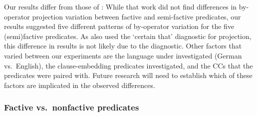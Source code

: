 \documentclass[a4paper,12pt,twoside]{article}
\newcommand{\posscite}[1]{\citeauthor{#1}'s (\citeyear{#1})}
\begin{document}
   Our results differ from those of \citealt{sieker_projective_2022}: While that work did not find differences in by-operator projection variation between factive and semi-factive predicates, our results suggested five different patterns of by-operator variation for the five (semi)factive predicates. As \citealt{sieker_projective_2022} also used the `certain that' diagnostic for projection, this difference in results is not likely due to the diagnostic. Other factors that varied between our experiments are the language under investigated (German vs.\ English), the clause-embedding predicates investigated, and the CCs that the predicates were paired with. Future research will need to establish which of these factors are implicated in the observed differences.
   

	\subsubsection{Factive vs.\ nonfactive predicates}
\end{document}
